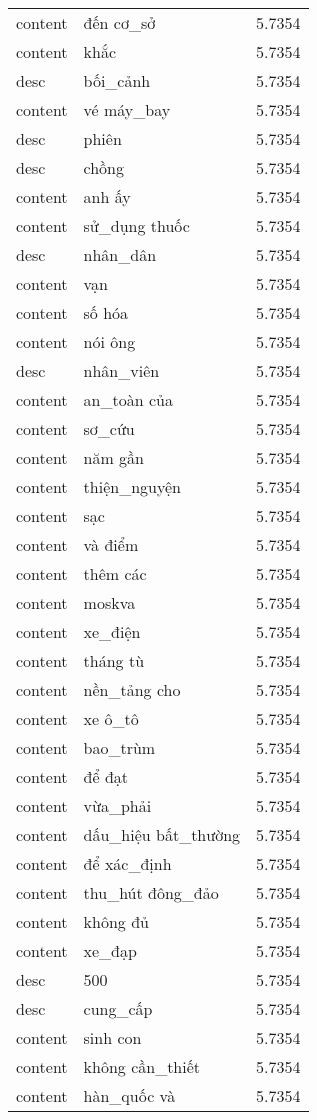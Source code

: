 \documentclass{article}
\begin{document}
\begin{tabular}{lll}
content & đến cơ\_sở & 5.7354\\
content & khắc & 5.7354\\
desc & bối\_cảnh & 5.7354\\
content & vé máy\_bay & 5.7354\\
desc & phiên & 5.7354\\
desc & chồng & 5.7354\\
content & anh ấy & 5.7354\\
content & sử\_dụng thuốc & 5.7354\\
desc & nhân\_dân & 5.7354\\
content & vạn & 5.7354\\
content & số hóa & 5.7354\\
content & nói ông & 5.7354\\
desc & nhân\_viên & 5.7354\\
content & an\_toàn của & 5.7354\\
content & sơ\_cứu & 5.7354\\
content & năm gần & 5.7354\\
content & thiện\_nguyện & 5.7354\\
content & sạc & 5.7354\\
content & và điểm & 5.7354\\
content & thêm các & 5.7354\\
content & moskva & 5.7354\\
content & xe\_điện & 5.7354\\
content & tháng tù & 5.7354\\
content & nền\_tảng cho & 5.7354\\
content & xe ô\_tô & 5.7354\\
content & bao\_trùm & 5.7354\\
content & để đạt & 5.7354\\
content & vừa\_phải & 5.7354\\
content & dấu\_hiệu bất\_thường & 5.7354\\
content & để xác\_định & 5.7354\\
content & thu\_hút đông\_đảo & 5.7354\\
content & không đủ & 5.7354\\
content & xe\_đạp & 5.7354\\
desc & 500 & 5.7354\\
desc & cung\_cấp & 5.7354\\
content & sinh con & 5.7354\\
content & không cần\_thiết & 5.7354\\
content & hàn\_quốc và & 5.7354\\

\end{tabular}
\end{document}
